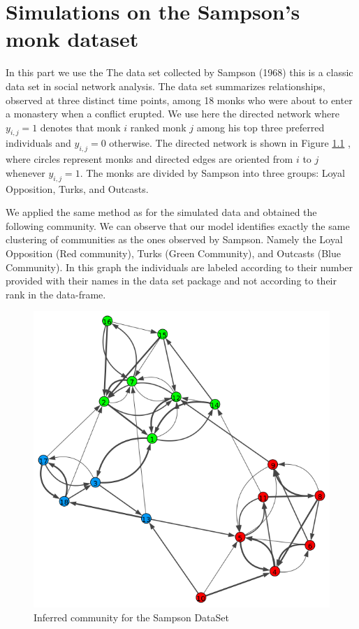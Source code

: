 \documentclass[12pt]{ociamthesis}  %
\begin{document}
	
	
	
	\chapter{Simulations on the Sampson’s monk dataset}
	In this part we use the The data set collected by Sampson (1968) this is a classic data set in social network analysis. The data set summarizes relationships, observed at three distinct time points, among 18 monks who were about to enter a monastery when a conflict erupted. We use here the directed network where $y_{i,j} = 1$ denotes that monk $i$ ranked monk $j$ among his top three preferred individuals and $y_{i,j} = 0$ otherwise. The directed network is shown in Figure \ref{label-image4} , where circles represent monks and directed edges are oriented from $i$ to $j$ whenever $y_{i,j} = 1$. The monks are divided by Sampson into three groups: Loyal Opposition, Turks, and Outcasts.
	
	We applied the same method as for the simulated data and obtained the following community. We can observe that our model identifies exactly the same clustering of communities as the ones observed by Sampson. Namely the Loyal Opposition (Red community), Turks (Green Community), and Outcasts (Blue Community). In this graph the individuals are labeled according to their number provided with their names in the data set package and not according to their rank in the data-frame.
	
	
	\begin{figure}
		\centering
		\includegraphics[width=\textwidth,height=\textheight,keepaspectratio]{OptimizationPlotSam}
		\caption{Inferred community for the Sampson DataSet}
		\label{label-image4}
	\end{figure}
	
	
\end{document}
